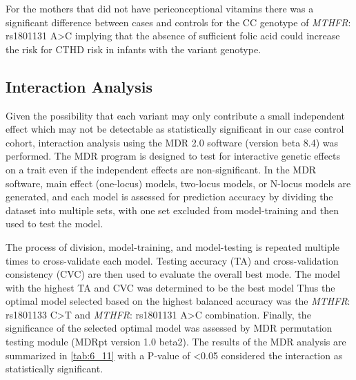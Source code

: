 \begin{refsection}
For the mothers that did not have periconceptional vitamins there was a significant difference between cases and controls for the CC genotype of \textit{MTHFR}: rs1801131 A>C implying that the absence of sufficient folic acid could increase the risk for CTHD risk in infants with the variant genotype.



\subsection{Interaction Analysis}

Given the possibility that each variant may only contribute a small independent effect which may not be detectable as statistically significant in our case control cohort, interaction analysis using the MDR 2.0 software (version beta 8.4) was performed. The MDR program is designed to test for interactive genetic effects on a trait even if the independent effects are non-significant. In the MDR software, main effect (one-locus) models, two-locus models, or N-locus models are generated, and each model is assessed for prediction accuracy by dividing the dataset into multiple sets, with one set excluded from model-training and then used to test the model. 

The process of division, model-training, and model-testing is repeated multiple times to cross-validate each model. Testing accuracy (TA) and cross-validation consistency (CVC) are then used to evaluate the overall best mode. The model with the highest TA and CVC was determined to be the best model Thus the optimal model selected based on the highest balanced accuracy was the \textit{MTHFR}: rs1801133 C>T and \textit{MTHFR}: rs1801131 A>C combination. Finally, the significance of the selected optimal model was assessed by MDR permutation testing module (MDRpt version 1.0 beta2). The results of the MDR analysis are summarized in \cref{tab:6_11} with a P-value of <0.05 considered the interaction as statistically significant.


\end{refsection}
